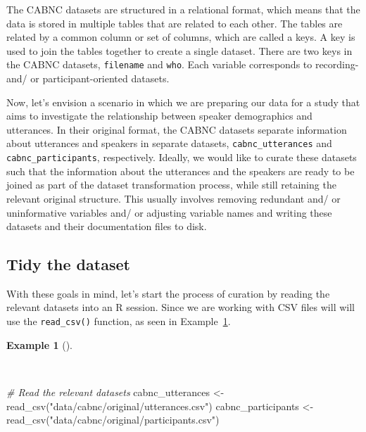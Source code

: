 \documentclass[
  letterpaper,
]{book}
\newenvironment{Shaded}{\begin{snugshade}}{\end{snugshade}}
\newcommand{\CommentTok}[1]{\textcolor[rgb]{0.00,0.00,0.00}{\textit{#1}}}
\newcommand{\FunctionTok}[1]{\textcolor[rgb]{0.00,0.00,0.00}{#1}}
\newcommand{\NormalTok}[1]{\textcolor[rgb]{0.00,0.00,0.00}{#1}}
\newcommand{\OtherTok}[1]{\textcolor[rgb]{0.00,0.00,0.00}{#1}}
\newcommand{\StringTok}[1]{\textcolor[rgb]{0.00,0.00,0.00}{#1}}
\theoremstyle{definition}
\newtheorem{example}{Example}[chapter]
\theoremstyle{remark}
\begin{document}
The CABNC datasets are structured in a relational format, which means
that the data is stored in multiple tables that are related to each
other. The tables are related by a common column or set of columns,
which are called a keys. A key is used to join the tables together to
create a single dataset. There are two keys in the CABNC datasets,
\texttt{filename} and \texttt{who}. Each variable corresponds to
recording- and/ or participant-oriented datasets.

Now, let's envision a scenario in which we are preparing our data for a
study that aims to investigate the relationship between speaker
demographics and utterances. In their original format, the CABNC
datasets separate information about utterances and speakers in separate
datasets, \texttt{cabnc\_utterances} and \texttt{cabnc\_participants},
respectively. Ideally, we would like to curate these datasets such that
the information about the utterances and the speakers are ready to be
joined as part of the dataset transformation process, while still
retaining the relevant original structure. This usually involves
removing redundant and/ or uninformative variables and/ or adjusting
variable names and writing these datasets and their documentation files
to disk.

\subsection{Tidy the dataset}\label{tidy-the-dataset}

With these goals in mind, let's start the process of curation by reading
the relevant datasets into an R session. Since we are working with CSV
files will will use the \texttt{read\_csv()} function, as seen in
Example~\ref{exm-curate-cabnc-read}.

\begin{example}[]\protect\hypertarget{exm-curate-cabnc-read}{}\label{exm-curate-cabnc-read}

~

\begin{Shaded}
\begin{Highlighting}[]
\CommentTok{\# Read the relevant datasets}
\NormalTok{cabnc\_utterances }\OtherTok{\textless{}{-}}
  \FunctionTok{read\_csv}\NormalTok{(}\StringTok{"data/cabnc/original/utterances.csv"}\NormalTok{)}
\NormalTok{cabnc\_participants }\OtherTok{\textless{}{-}}
  \FunctionTok{read\_csv}\NormalTok{(}\StringTok{"data/cabnc/original/participants.csv"}\NormalTok{)}
\end{Highlighting}
\end{Shaded}

\end{example}
\end{document}
